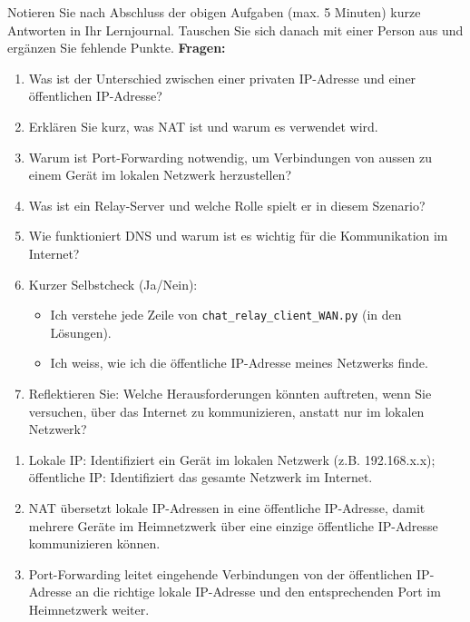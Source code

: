\begin{myexercise}
    [Reflexionsfragen]
    Notieren Sie nach Abschluss der obigen Aufgaben (max. 5 Minuten) kurze Antworten in Ihr Lernjournal. Tauschen Sie sich danach mit einer Person aus und ergänzen Sie fehlende Punkte.
    \textbf{Fragen:}
    \begin{enumerate}
        \item Was ist der Unterschied zwischen einer privaten \gls{IP}-Adresse und einer öffentlichen \gls{IP}-Adresse?
        \item Erklären Sie kurz, was \gls{NAT} ist und warum es verwendet wird.
        \item Warum ist Port-Forwarding notwendig, um Verbindungen von aussen zu einem Gerät im lokalen Netzwerk herzustellen?
        \item Was ist ein Relay-Server und welche Rolle spielt er in diesem Szenario?
        \item Wie funktioniert \gls{DNS} und warum ist es wichtig für die Kommunikation im Internet?
        \item Kurzer Selbstcheck (Ja/Nein):
              \begin{itemize}
                  \item Ich verstehe jede Zeile von \texttt{chat\_relay\_client\_WAN.py} (in den Lösungen).
                  \item Ich weiss, wie ich die öffentliche \gls{IP}-Adresse meines Netzwerks finde.
              \end{itemize}
        \item Reflektieren Sie: Welche Herausforderungen könnten auftreten, wenn Sie versuchen, über das Internet zu kommunizieren, anstatt nur im lokalen Netzwerk?
    \end{enumerate}
    \begin{myanswer}
        \begin{enumerate}
            \item Lokale \acrshort{IP}: Identifiziert ein Gerät im lokalen Netzwerk (z.B. 192.168.x.x); öffentliche \acrshort{IP}: Identifiziert das gesamte Netzwerk im Internet.
            \item \gls{NAT} übersetzt lokale \gls{IP}-Adressen in eine öffentliche \gls{IP}-Adresse, damit mehrere Geräte im Heimnetzwerk über eine einzige öffentliche \gls{IP}-Adresse kommunizieren können.
            \item Port-Forwarding leitet eingehende Verbindungen von der öffentlichen \gls{IP}-Adresse an die richtige lokale \gls{IP}-Adresse und den entsprechenden Port im Heimnetzwerk weiter.

\end{enumerate}
\end{myanswer}
\end{myexercise}
